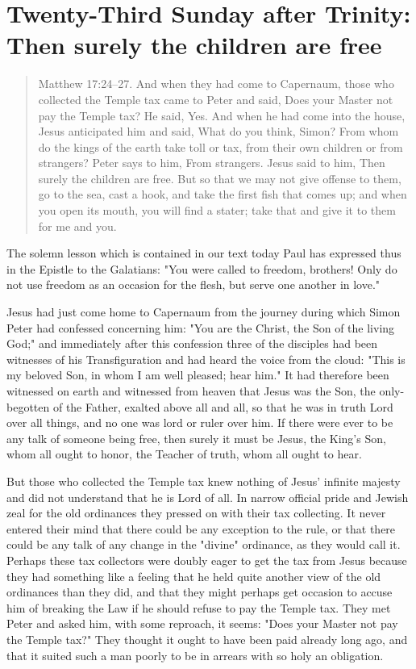 
\section{Twenty-Third Sunday after Trinity: Then surely the children are free}

\begin{quote}

Matthew 17:24–27. And when they had come to Capernaum, those who collected the Temple tax came to Peter and said, Does your Master not pay the Temple tax? He said, Yes. And when he had come into the house, Jesus anticipated him and said, What do you think, Simon? From whom do the kings of the earth take toll or tax, from their own children or from strangers? Peter says to him, From strangers. Jesus said to him, Then surely the children are free. But so that we may not give offense to them, go to the sea, cast a hook, and take the first fish that comes up; and when you open its mouth, you will find a stater; take that and give it to them for me and you.

\end{quote}

\bigskip

The solemn lesson which is contained in our text today Paul has expressed thus in the Epistle to the Galatians: "You were called to freedom, brothers! Only do not use freedom as an occasion for the flesh, but serve one another in love."

Jesus had just come home to Capernaum from the journey during which Simon Peter had confessed concerning him: "You are the Christ, the Son of the living God;" and immediately after this confession three of the disciples had been witnesses of his Transfiguration and had heard the voice from the cloud: "This is my beloved Son, in whom I am well pleased; hear him." It had therefore been witnessed on earth and witnessed from heaven that Jesus was the Son, the only-begotten of the Father, exalted above all and all, so that he was in truth Lord over all things, and no one was lord or ruler over him. If there were ever to be any talk of someone being free, then surely it must be Jesus, the King’s Son, whom all ought to honor, the Teacher of truth, whom all ought to hear.

But those who collected the Temple tax knew nothing of Jesus’ infinite majesty and did not understand that he is Lord of all. In narrow official pride and Jewish zeal for the old ordinances they pressed on with their tax collecting. It never entered their mind that there could be any exception to the rule, or that there could be any talk of any change in the "divine" ordinance, as they would call it. Perhaps these tax collectors were doubly eager to get the tax from Jesus because they had something like a feeling that he held quite another view of the old ordinances than they did, and that they might perhaps get occasion to accuse him of breaking the Law if he should refuse to pay the Temple tax. They met Peter and asked him, with some reproach, it seems: "Does your Master not pay the Temple tax?" They thought it ought to have been paid already long ago, and that it suited such a man poorly to be in arrears with so holy an obligation.

